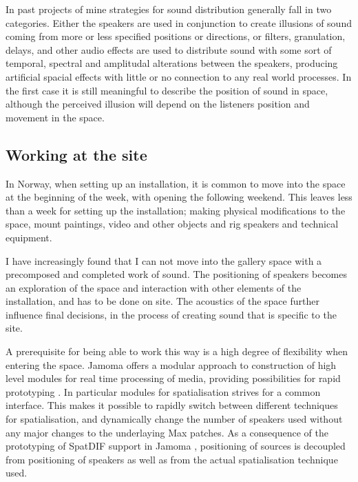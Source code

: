 \documentclass{article}
\begin{document}
In past projects of mine strategies for sound distribution generally fall in two categories. Either the speakers are used in conjunction to create illusions of sound coming from more or less specified positions or directions, or filters, granulation, delays, and other audio effects are used to distribute sound with some sort of temporal, spectral and amplitudal alterations between the speakers, producing artificial spacial effects with little or no connection to any real world processes. In the first case it is still meaningful to describe the position of sound in space, although the perceived illusion will depend on the listeners position and movement in the space.



\subsection{Working at the site}

In Norway, when setting up an installation, it is common to move into the space at the beginning of the week, with opening the following weekend. This leaves less than a week for setting up the installation; making physical modifications to the space, mount paintings, video and other objects and rig speakers and technical equipment. 

I have increasingly found that I can not move into the gallery space with a precomposed and completed work of sound. The positioning of speakers becomes an exploration of the space and interaction with other elements of the installation, and has to be done on site. The acoustics of the space further influence final decisions, in the process of creating sound that is specific to the site.

A prerequisite for being able to work this way is a high degree of flexibility when entering the space. Jamoma offers a modular approach to construction of high level modules for real time processing of media, providing possibilities for rapid prototyping \cite{Place:2006jamoma}. In particular modules for spatialisation strives for a common interface. This makes it possible to rapidly switch between different techniques for spatialisation, and dynamically change the number of speakers used without any major changes to the underlaying Max patches. As a consequence of the prototyping of SpatDIF support in Jamoma \cite{Peters:2008spatdif}, positioning of sources is decoupled from positioning of speakers as well as from the actual spatialisation technique used.
\end{document}

